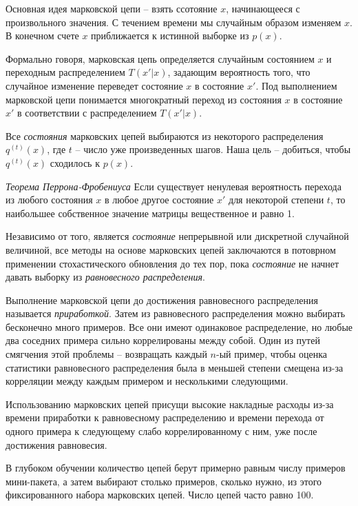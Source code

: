 \documentclass[%
	11pt,
	a4paper,
	utf8,
]{article}
\begin{document}
Основная идея марковской цепи -- взять ссотояние $ x $, начинающееся с произвольного значения. С течением времени мы случайным образом изменяем $ x $. В конечном счете $ x $ приближается к истинной выборке из $ p(x) $. 

Формально говоря, марковская цепь определяется случайным состоянием $ x $ и переходным распределением $ T(x' | x) $, задающим вероятность того, что случайное изменение переведет состояние $ x $ в состояние $ x' $. Под выполнением марковской цепи понимается многократный переход из состояния $ x $ в состояние $ x' $ в соответствии с распределением $ T(x' | x) $.

Все \emph{состояния} марковских цепей выбираются из некоторого распределения $ q^{(t)}(x) $, где $ t $ -- число уже произведенных шагов. Наша цель -- добиться, чтобы $ q^{(t)}(x) $ сходилось к $ p(x) $.

\emph{Теорема Перрона-Фробениуса} Если существует ненулевая вероятность перехода из любого состояния $ x $ в любое другое состояние $ x' $ для некоторой степени $ t $, то наибольшее собственное значение матрицы вещественное и равно 1.

Независимо от того, является \emph{состояние} непрерывной или дискретной случайной величиной, все методы на основе марковских цепей заключаются в потоврном применении стохастического обновления до тех пор, {\color{blue}пока \emph{состояние} не начнет давать выборку из \emph{равновесного распределения}}.

Выполнение марковской цепи до достижения равновесного распределения называется \emph{приработкой}. Затем из равновесного распределения можно выбирать бесконечно много примеров. Все они имеют одинаковое распределение, но любые два соседних примера сильно коррелированы между собой. Один из путей смягчения этой проблемы -- возвращать каждый $ n $-ый пример, чтобы оценка статистики равновесного распределения была в меньшей степени смещена из-за корреляции между каждым примером и несколькими следующими.

Использованию марковских цепей присущи высокие накладные расходы из-за времени приработки к равновесному распределению и времени перехода от одного примера к следующему слабо коррелированному с ним, уже после достижения равновесия. 

В глубоком обучении количество цепей берут примерно равным числу примеров мини-пакета, а затем выбирают столько примеров, сколько нужно, из этого фиксированного набора марковских цепей. Число цепей часто равно 100.
\end{document}
